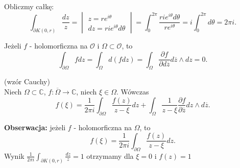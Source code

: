 \documentclass[../main.tex]{subfiles}
\begin{document}
\begin{przyklad}
    Obliczmy całkę:
    \[
        \int_{\partial K(0,r)} \frac{dz}{z} = \begin{vmatrix} z = re^{i\theta}\\ dz = rie^{i\theta}d\theta \end{vmatrix} = \int_0^{2\pi} \frac{rie^{i\theta}d\theta}{re^{i\theta}} = i \int_0^{2\pi}d\theta = 2\pi i
    .\]
\end{przyklad}
\begin{stw}
    Jeżeli $f$ - holomorficzna na $\mathcal{O}$ i $\Omega \subset\mathcal{O}$, to
    \[
        \int_{\partial \Omega} fdz = \int_\Omega d(fdz) = \int_{\Omega} \frac{\partial f}{\partial d\overline{z}} d\overline{z}\land dz = 0
    .\]
\end{stw}
\begin{tw}
    (wzór Cauchy)\\
    Niech $\Omega\subset\mathbb{C}$, $f: \overline{\Omega} \to \mathbb{C}$, niech $\xi \in \Omega$. Wówczas  \[
        f(\xi) = \frac{1}{2\pi i }\int_{\partial \Omega}\frac{f(z)}{z-\xi}dz + \int_{\Omega} \frac{1}{z - \xi}\frac{\partial f}{\partial \overline{z}} dz\land d\overline{z}
    .\]
\end{tw}
\textbf{Obserwacja:} jeżeli $f$ - holomorficzna na $\Omega$, to
\[
    f(\xi) = \frac{1}{2\pi i} \int_{\partial \Omega}\frac{f(z)}{z - \xi} dz
.\]
Wynik $\frac{1}{2\pi i }\int_{\partial K(0,r)} \frac{dz}{z} = 1$ otrzymamy dla $\xi = 0$ i $f(z) = 1$
\end{document}
